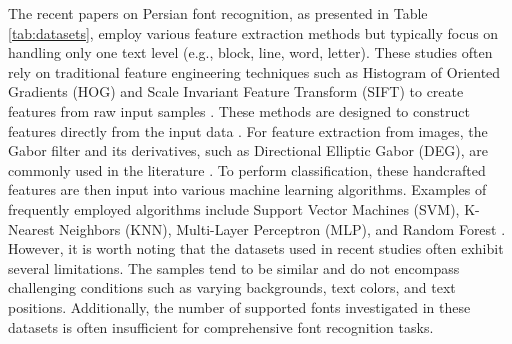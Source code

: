 \documentclass[conference]{IEEEtran}
\begin{document}
The recent papers on Persian font recognition, as presented in Table \ref{tab:datasets}, employ various feature extraction methods but typically focus on handling only one text level (e.g., block, line, word, letter).
These studies often rely on traditional feature engineering techniques such as Histogram of Oriented Gradients (HOG) and Scale Invariant Feature Transform (SIFT) to create features from raw input samples \cite{36}. These methods are designed to construct features directly from the input data \cite{36}.
For feature extraction from images, the Gabor filter and its derivatives, such as Directional Elliptic Gabor (DEG), are commonly used in the literature \cite{32}.
To perform classification, these handcrafted features are then input into various machine learning algorithms. Examples of frequently employed algorithms include Support Vector Machines (SVM), K-Nearest Neighbors (KNN), Multi-Layer Perceptron (MLP), and Random Forest \cite{7, 11}.
However, it is worth noting that the datasets used in recent studies often exhibit several limitations. The samples tend to be similar and do not encompass challenging conditions such as varying backgrounds, text colors, and text positions. Additionally, the number of supported fonts investigated in these datasets is often insufficient for comprehensive font recognition tasks.
\end{document}
